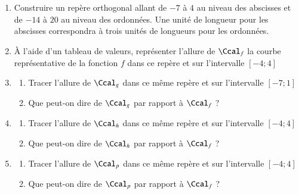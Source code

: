 \documentclass[oneside,12pt]{article}          			%
\begin{document}
\begin{enumerate}
	\item Construire un repère orthogonal allant de $-7$ à $4$ au niveau des abscisses et de $-14$ à $20$ au niveau des ordonnées. Une unité de longueur pour les abscisses correspondra à trois unités de longueurs pour les ordonnées.
	\item À l'aide d'un tableau de valeurs, représenter l'allure de $\Ccal_f$ la courbe représentative de la fonction $f$ dans ce repère et sur l'intervalle $[-4;4]$
	\item \begin{enumerate}
		\item Tracer l'allure de $\Ccal_g$ dans ce même repère et sur l'intervalle $[-7;1]$
		\item Que peut-on dire de $\Ccal_g$ par rapport à $\Ccal_f$ ?
	\end{enumerate}
	\item \begin{enumerate}
		\item Tracer l'allure de $\Ccal_h$ dans ce même repère et sur l'intervalle $[-4;4]$
		\item Que peut-on dire de $\Ccal_h$ par rapport à $\Ccal_f$ ?
	\end{enumerate}
	\item \begin{enumerate}
		\item Tracer l'allure de $\Ccal_p$ dans ce même repère et sur l'intervalle $[-4;4]$
		\item Que peut-on dire de $\Ccal_p$ par rapport à $\Ccal_f$ ?
	\end{enumerate}
\end{enumerate}
\end{document}
